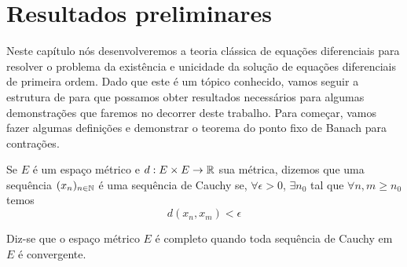 \chapter{Resultados preliminares}

Neste capítulo nós desenvolveremos a teoria clássica de equações diferenciais para resolver o problema da existência e unicidade da solução de equações diferenciais de primeira ordem. Dado que este é um tópico conhecido, vamos seguir a estrutura de \cite{milton2017} para que possamos obter resultados necessários para algumas demonstrações que faremos no decorrer deste trabalho. Para começar, vamos fazer algumas definições e demonstrar o teorema do ponto fixo de Banach para contrações.

\begin{definition}
    \label{seqCauchy}
    Se $E$ é um espaço métrico e $d:E\times E\to\mathbb{R}$ sua métrica, dizemos que uma sequência $(x_n)_{n\in\mathbb{N}}$ é uma sequência de Cauchy se, $\forall\epsilon>0$, $\exists n_0$ tal que $\forall n,m \geq n_0$ temos
    \begin{equation}
        d(x_n,x_m) < \epsilon
    \end{equation}
\end{definition}

\begin{definition}
    \label{defEspacoCompleto}
    Diz-se que o espaço métrico $E$ é completo quando toda sequência de Cauchy em $E$ é convergente.
\end{definition}

